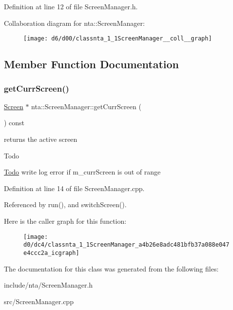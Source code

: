 Definition at line 12 of file Screen\+Manager.\+h.



Collaboration diagram for nta\+:\+:Screen\+Manager\+:
\nopagebreak
\begin{figure}[H]
\begin{center}
\leavevmode
\texttt{[image: d6/d00/classnta\_1\_1ScreenManager\_\_coll\_\_graph]}
\end{center}
\end{figure}


\subsection{Member Function Documentation}
\mbox{\label{classnta_1_1ScreenManager_a4b26e8adc481bfb37a088e047e4ccc2a}} 
\subsubsection{\texorpdfstring{get\+Curr\+Screen()}{getCurrScreen()}}
{\footnotesize\ttfamily \hyperlink{classnta_1_1Screen}{Screen} $\ast$ nta\+::\+Screen\+Manager\+::get\+Curr\+Screen (\begin{DoxyParamCaption}{ }\end{DoxyParamCaption}) const}



returns the active screen 

\begin{DoxyRefDesc}{Todo}
\item[\hyperlink{todo__todo000009}{Todo}]write log error if m\+\_\+curr\+Screen is out of range \end{DoxyRefDesc}


Definition at line 14 of file Screen\+Manager.\+cpp.



Referenced by run(), and switch\+Screen().

Here is the caller graph for this function\+:
\nopagebreak
\begin{figure}[H]
\begin{center}
\leavevmode
\texttt{[image: d0/dc4/classnta\_1\_1ScreenManager\_a4b26e8adc481bfb37a088e047e4ccc2a\_icgraph]}
\end{center}
\end{figure}


The documentation for this class was generated from the following files\+:\begin{DoxyCompactItemize}
\item 
include/nta/Screen\+Manager.\+h\item 
src/Screen\+Manager.\+cpp\end{DoxyCompactItemize}
